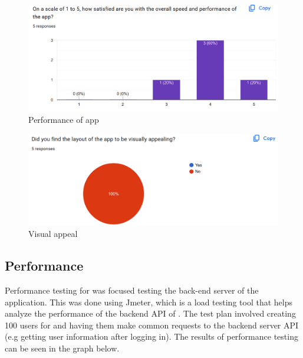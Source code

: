 \documentclass[12pt, titlepage]{article}
\begin{document}
\begin{figure}[H]
    \centering
    \includegraphics[width=1\linewidth]{Usability_5.png}
    \caption{Performance of app}
    \label{fig: Performance of app}
\end{figure}

\begin{figure}[H]
    \centering
    \includegraphics[width=1\linewidth]{Usability_6.png}
    \caption{Visual appeal}
    \label{fig: Visual appeal}
\end{figure}

		
\subsection{Performance}

Performance testing for \progname{} was focused testing the back-end server of the application. This was done using Jmeter, which is a load testing tool that helps analyze the performance of the backend API of \progname{}. The test plan involved creating 100 users for \progname{} and having them make common requests to the backend server API (e.g getting user information after logging in). The results of performance testing can be seen in the graph below.
\end{document}
